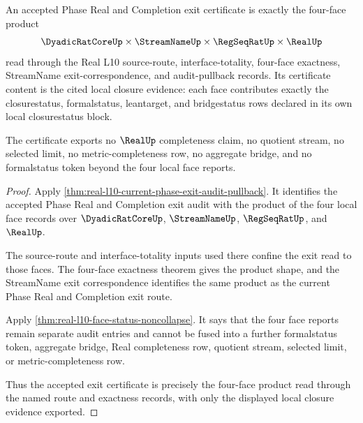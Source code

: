 \begin{theorem}
\label{thm:real-l10-current-phase-exit-certificate}
An accepted Phase Real and Completion exit certificate is exactly the
four-face product
$$
\DyadicRatCoreUp \times \StreamNameUp \times \RegSeqRatUp \times \RealUp
$$
read through the Real L10 source-route, interface-totality, four-face
exactness, StreamName exit-correspondence, and audit-pullback records. Its
certificate content is the cited local closure evidence: each face contributes
exactly the closurestatus, formalstatus, leantarget, and bridgestatus rows
declared in its own local closurestatus block.

The certificate exports no $\RealUp$ completeness claim, no quotient stream,
no selected limit, no metric-completeness row, no aggregate bridge, and no
formalstatus token beyond the four local face reports.
\end{theorem}
\begin{proof}
Apply \autoref{thm:real-l10-current-phase-exit-audit-pullback}. It identifies
the accepted Phase Real and Completion exit audit with the product of the
four local face records over $\DyadicRatCoreUp$, $\StreamNameUp$,
$\RegSeqRatUp$, and $\RealUp$.

The source-route and interface-totality inputs used there confine the exit
read to those faces. The four-face exactness theorem gives the product
shape, and the StreamName exit correspondence identifies the same product as
the current Phase Real and Completion exit route.

Apply \autoref{thm:real-l10-face-status-noncollapse}. It says that the four
face reports remain separate audit entries and cannot be fused into a further
formalstatus token, aggregate bridge, Real completeness row, quotient stream,
selected limit, or metric-completeness row.

Thus the accepted exit certificate is precisely the four-face product read
through the named route and exactness records, with only the displayed local
closure evidence exported.
\end{proof}

